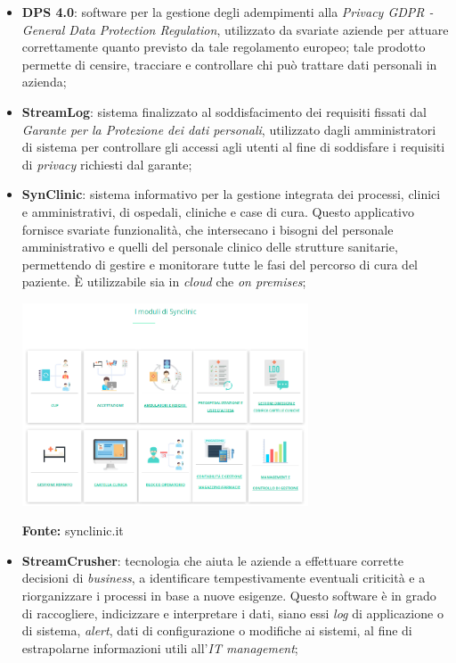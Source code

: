 \begin{itemize}
  \item \textbf{DPS 4.0}: software per la gestione degli adempimenti alla \textit{Privacy GDPR - General Data Protection Regulation}, utilizzato da svariate aziende per attuare correttamente quanto previsto da tale regolamento europeo; tale prodotto permette di censire, tracciare e controllare chi può trattare dati personali in azienda;

  \item \textbf{StreamLog}: sistema finalizzato al soddisfacimento dei requisiti fissati dal \textit{Garante per la Protezione dei dati personali}, utilizzato dagli amministratori di sistema per controllare gli accessi agli utenti al fine di soddisfare i requisiti di \textit{privacy} richiesti dal garante;

  \item \textbf{SynClinic}: sistema informativo per la gestione integrata dei processi, clinici e amministrativi, di ospedali, cliniche e case di cura. Questo applicativo fornisce svariate funzionalità, che intersecano i bisogni del personale amministrativo e quelli del personale clinico delle strutture sanitarie, permettendo di gestire e monitorare tutte le fasi del percorso di cura del paziente. È utilizzabile sia in \textit{cloud} che \textit{on premises};

  \begin{minipage}{\linewidth}
    \centering
      \includegraphics[height=6cm]{immagini/synclinic}
    \caption*{\textbf{Fonte:} synclinic.it}
  \end{minipage}

  \item \textbf{StreamCrusher}: tecnologia che aiuta le aziende a effettuare corrette decisioni di \textit{business}, a identificare tempestivamente eventuali criticità e a riorganizzare i processi in base a nuove esigenze. Questo software è in grado di raccogliere, indicizzare e interpretare i dati, siano essi \textit{log} di applicazione o di sistema, \textit{alert}, dati di configurazione o modifiche ai sistemi, al fine di estrapolarne informazioni utili all'\textit{IT management};


\end{itemize}
